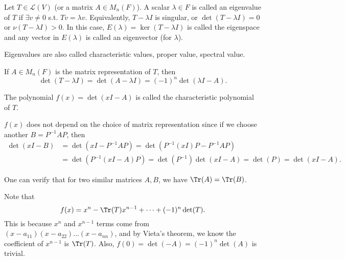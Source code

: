 \begin{definition}
    Let \(T \in \mathcal{L} (V)\) (or a matrix \(A \in M_n(F)\)). A scalar \(\lambda \in F\) is called an eigenvalue of \(T\) if \(\exists v \neq 0\) s.t. \(Tv = \lambda v\). Equivalently, \(T - \lambda I\) is singular, or \(\det (T - \lambda I) = 0\) or \(\nu (T - \lambda I) > 0\). In this case, \(E(\lambda ) = \ker (T - \lambda I)\) is called the eigenspace and any vector in \(E(\lambda )\) is called an eigenvector (for \(\lambda \)).        
\end{definition}

\begin{remark}
    Eigenvalues are also called characteristic values, proper value, spectral value.
\end{remark}

If \(A \in M_n(F)\) is the matrix representation of \(T\), then 
\[
    \det (T - \lambda I) = \det (A - \lambda I) = (-1)^n \det \left( \lambda I - A \right). 
\]  

\begin{definition}
    The polynomial \(f(x) = \det \left( xI - A \right) \) is called the characteristic polynomial of \(T\).  
\end{definition}

\begin{remark}
    \(f(x)\) does not depend on the choice of matrix representation since if we choose another \(B = P^{-1} A P\), then 
    \begin{align*}
        \det \left( xI - B \right) &= \det \left( xI - P^{-1} A P \right) = \det \left( P^{-1} (xI) P - P^{-1} A P \right) \\
        &= \det \left( P^{-1} \left( xI - A \right) P  \right) = \det \left( P^{-1} \right) \det (xI - A) = \det (P) = \det (xI-A).  
    \end{align*} 
\end{remark}

\begin{remark}
    One can verify that for two similar matrices \(A, B\), we have \(\Tr (A) = \Tr (B)\).  
\end{remark}

\begin{remark}
    Note that 
    \[
        f(x) = x^n - \Tr (T) x^{n-1} + \dots + (-1)^n \det (T).
    \] This is because \(x^n\) and \(x^{n-1}\) terms come from \((x-a_{11})(x-a_{22})\dots (x-a_{nn} )\), and by Vieta's theorem, we know the coefficient of \(x^{n-1}\) is \(\Tr (T)\). Also, \(f(0) = \det (-A) = (-1)^n \det (A)\) is trivial.      
\end{remark}

